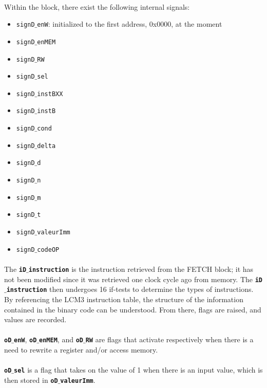 \documentclass{article}
\begin{document}
\paragraph{}Within the block, there exist the following internal signals: 
\begin{itemize}
\item \texttt{signD$\_$enW}: initialized to the first address, 0x0000, at the moment
\item \texttt{signD$\_$enMEM}
\item \texttt{signD$\_$RW}
\item \texttt{signD$\_$sel}
\item \texttt{signD$\_$instBXX}
\item \texttt{signD$\_$instB}
\item \texttt{signD$\_$cond}
\item \texttt{signD$\_$delta}
\item \texttt{signD$\_$d}
\item \texttt{signD$\_$n}
\item \texttt{signD$\_$m}
\item \texttt{signD$\_$t}
\item \texttt{signD$\_$valeurImm}
\item \texttt{signD$\_$codeOP}
\end{itemize}


\paragraph{}The \textbf{\texttt{iD$\_$instruction}} is the instruction retrieved from the FETCH block; it has not been modified since it was retrieved one clock cycle ago from memory. The \textbf{\texttt{iD$\_$instruction}} then undergoes 16 if-tests to determine the types of instructions. By referencing the LCM3 instruction table, the structure of the information contained in the binary code can be understood. From there, flags are raised, and values are recorded.

\paragraph{}\textbf{\texttt{oD$\_$enW}}, \textbf{\texttt{oD$\_$enMEM}}, and \textbf{\texttt{oD$\_$RW}} are flags that activate respectively when there is a need to rewrite a register and/or access memory.

\paragraph{}\textbf{\texttt{oD$\_$sel}} is a flag that takes on the value of 1 when there is an input value, which is then stored in \textbf{\texttt{oD$\_$valeurImm}}.
\end{document}
